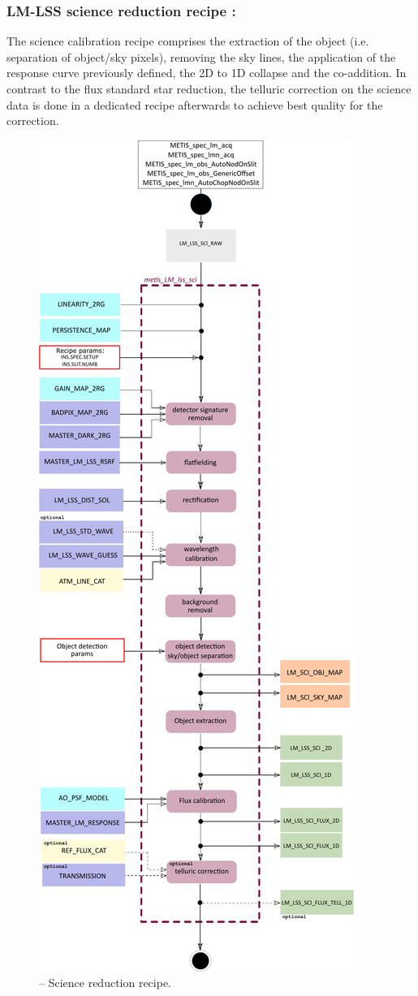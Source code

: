 \subsubsection{LM-LSS science reduction recipe :}\label{rec:metis_lm_lss_sci}
The science calibration recipe comprises the extraction of the object (i.e. separation of object/sky pixels), removing the sky lines, the application of the response curve previously defined, the 2D to 1D collapse and the co-addition. In contrast to the flux standard star reduction, the telluric correction on the science data is done in a dedicated recipe afterwards to achieve best quality for the correction.
\begin{figure}[ht]
  \centering
  \includegraphics[width=0.36\textheight]{figures/metis_lm_lss_sci_v0.83.pdf}
  \caption[Recipe: ]{ --
    Science reduction recipe.}
  \label{Fig:rec_lm_lss_sci}
\end{figure}
